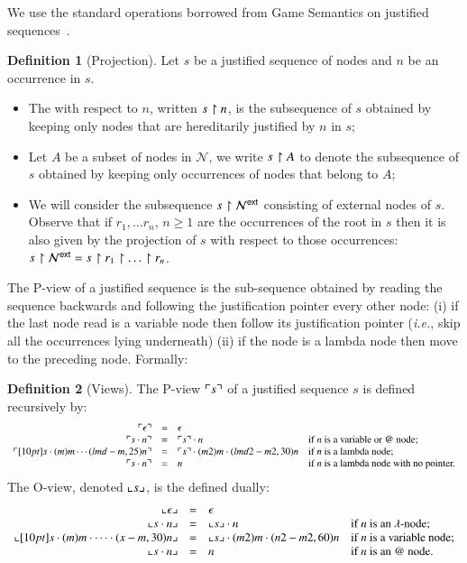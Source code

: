 \documentclass{elsarticle}
\makeatletter
\theoremstyle{plain}
\theoremstyle{definition}
\newtheorem{definition}{Definition}[section]
\theoremstyle{remark}
\newcommand\Nodes{\mathcal{N}}%
\newcommand{\ExtNodes}{\Nodes^{\sf ext}}
\renewcommand\ie{{\it i.e.\@\xspace}}
\makeatother
\begin{document}
We use the standard operations borrowed from Game Semantics on justified sequences~\cite{Abr02}.

\begin{definition}[Projection]
Let $s$ be a justified sequence of nodes and $n$ be an occurrence in $s$.

\begin{itemize}
\item The  with respect to $n$, written $s\upharpoonright n$, is the subsequence of $s$ obtained by keeping only nodes that are hereditarily justified by $n$ in $s$;

 \item Let $A$ be a subset of nodes in $\Nodes$, we write $s \upharpoonright A$ to denote the subsequence of $s$ obtained by keeping only occurrences of nodes that belong to $A$;

 \item We will consider the subsequence $s\filter\ExtNodes$ consisting of external nodes of $s$. Observe that if $r_1, \ldots r_n$, $n\geq 1$ are the occurrences of the root in $s$ then it is also given by the projection of $s$ with respect to those occurrences: $s\filter\ExtNodes = s\filter r_1 \filter \ldots \filter r_n$.
\end{itemize}
\end{definition}

The P-view of a justified sequence is the sub-sequence obtained by reading the sequence backwards and following the justification pointer every other node: (i) if the last node read is a variable node then follow its justification pointer (\ie, skip all the occurrences lying underneath) (ii) if the node is a lambda node then move to the preceding node. Formally:
\begin{definition}[Views]
\label{def:views}
The P-view $\ulcorner s \urcorner$ of a justified sequence $s$ is defined recursively by:
$$\begin{array}{rcll}
 \pview{\epsilon} &=&  \epsilon \\
 \pview{s \cdot n }  &=&  \pview{s} \cdot n
    & \mbox{if $n$ is a variable or $@$ node;}
    \\
 \pview{\Pstr[10pt]{ s \cdot (m){m} \cdots (lmd-m,25){n}}} &=&
        \Pstr{ \pview{s} \cdot (m2){m} \cdot (lmd2-m2,30){n} }
    & \mbox{if $n$ is a lambda node;}
    \\
 \pview{s \cdot n }  &=&  n & \mbox{if $n$ is a lambda node with no pointer.}
\end{array}$$
The O-view, denoted $\llcorner s \lrcorner$, is the defined dually:
$$\begin{array}{rcll}
 \oview{\epsilon} &=&  \epsilon \\
 \oview{s \cdot n }  &=&  \oview{s} \cdot n
    & \mbox{if $n$ is an $\lambda$-node;}
    \\
 \oview{\Pstr[10pt]{s \cdot (m){m} \cdot \cdots \cdot (x-m,30){n}}} &=&
    \Pstr{ \oview{s} \cdot (m2){m} \cdot (n2-m2,60){n} }
    & \mbox{if $n$ is a variable node;}
    \\
 \oview{s \cdot n }  &=&  n
    & \mbox{if $n$ is an $@$ node.}
\end{array}$$
\end{definition}
\end{document}
